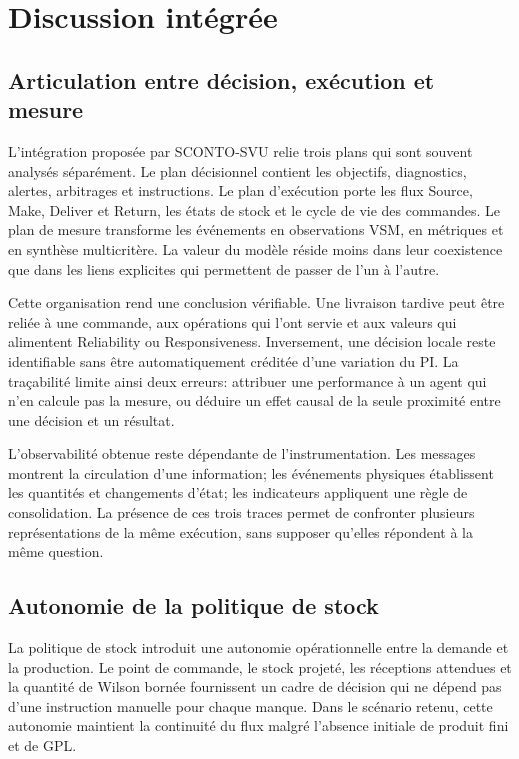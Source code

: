 \chapter{Discussion intégrée}
\label{chap:discussion}

\section{Articulation entre décision, exécution et mesure}

L'intégration proposée par SCONTO-SVU relie trois plans qui sont souvent analysés séparément. Le plan décisionnel contient les objectifs, diagnostics, alertes, arbitrages et instructions. Le plan d'exécution porte les flux Source, Make, Deliver et Return, les états de stock et le cycle de vie des commandes. Le plan de mesure transforme les événements en observations VSM, en métriques et en synthèse multicritère. La valeur du modèle réside moins dans leur coexistence que dans les liens explicites qui permettent de passer de l'un à l'autre.

Cette organisation rend une conclusion vérifiable. Une livraison tardive peut être reliée à une commande, aux opérations qui l'ont servie et aux valeurs qui alimentent Reliability ou Responsiveness. Inversement, une décision locale reste identifiable sans être automatiquement créditée d'une variation du PI. La traçabilité limite ainsi deux erreurs: attribuer une performance à un agent qui n'en calcule pas la mesure, ou déduire un effet causal de la seule proximité entre une décision et un résultat.

L'observabilité obtenue reste dépendante de l'instrumentation. Les messages montrent la circulation d'une information; les événements physiques établissent les quantités et changements d'état; les indicateurs appliquent une règle de consolidation. La présence de ces trois traces permet de confronter plusieurs représentations de la même exécution, sans supposer qu'elles répondent à la même question.

\section{Autonomie de la politique de stock}

La politique de stock introduit une autonomie opérationnelle entre la demande et la production. Le point de commande, le stock projeté, les réceptions attendues et la quantité de Wilson bornée fournissent un cadre de décision qui ne dépend pas d'une instruction manuelle pour chaque manque. Dans le scénario retenu, cette autonomie maintient la continuité du flux malgré l'absence initiale de produit fini et de GPL.

